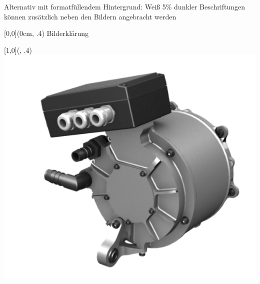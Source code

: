 \begin{frame}
    
Alternativ mit formatfüllendem Hintergrund: Weiß 5\% dunkler\newline
Beschriftungen können zusätzlich neben den Bildern angebracht werden

\begin{textblock*}{\paperwidth}[0,0](0cm, .4\textheight)%
Bilderklärung
\end{textblock*}

\begin{textblock*}{\paperwidth}[1,0](\textwidth, .4\textheight)%
\raggedleft%
\includegraphics[height=0.5\textheight]{./Resources/Presentation/Images/Motor.png}
\end{textblock*}

\end{frame}
\clearpage


